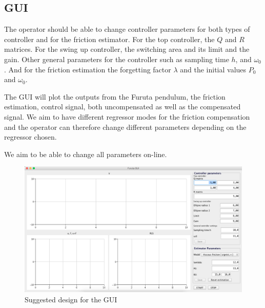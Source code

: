 \documentclass[10pt,a4paper]{article}
\begin{document}
\subsection{GUI}
The operator should be able to change controller parameters for both types of controller and for the friction estimator. For the top controller, the $Q$ and $R$ matrices. For the swing up controller, the switching area and its limit and the gain. Other general parameters for the controller such as sampling time $h$, and $\omega _0$. And for the friction estimation the forgetting factor $\lambda$ and the initial values $P_0$ and $\omega _0$.

The GUI will plot the outputs from the Furuta pendulum, the friction estimation, control signal, both uncompensated as well as the compensated signal. We aim to have different regressor modes for the friction compensation and the operator can therefore change different parameters depending on the regressor chosen. 

We aim to be able to change all parameters on-line.
\begin{figure}[H]
\centerline{\includegraphics[scale=0.7]{gui.png}}
\caption{Suggested design for the GUI}
\label{fig:uml}
\end{figure}
\end{document}
